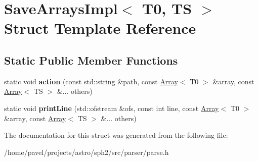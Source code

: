 \hypertarget{structSaveArraysImpl}{}\section{Save\+Arrays\+Impl$<$ T0, TS $>$ Struct Template Reference}
\label{structSaveArraysImpl}
\subsection*{Static Public Member Functions}
\begin{DoxyCompactItemize}
\item 
\hypertarget{structSaveArraysImpl_a96e39c817382fbb444ed8d2fa7e2d7f0}{}\label{structSaveArraysImpl_a96e39c817382fbb444ed8d2fa7e2d7f0} 
static void {\bfseries action} (const std\+::string \&path, const \hyperlink{classArray}{Array}$<$ T0 $>$ \&array, const \hyperlink{classArray}{Array}$<$ TS $>$ \&... others)
\item 
\hypertarget{structSaveArraysImpl_aa7ece4317c14bfdd58452964ca1cdca9}{}\label{structSaveArraysImpl_aa7ece4317c14bfdd58452964ca1cdca9} 
static void {\bfseries print\+Line} (std\+::ofstream \&ofs, const int line, const \hyperlink{classArray}{Array}$<$ T0 $>$ \&array, const \hyperlink{classArray}{Array}$<$ TS $>$ \&... others)
\end{DoxyCompactItemize}


The documentation for this struct was generated from the following file\+:\begin{DoxyCompactItemize}
\item 
/home/pavel/projects/astro/sph2/src/parser/parse.\+h\end{DoxyCompactItemize}
